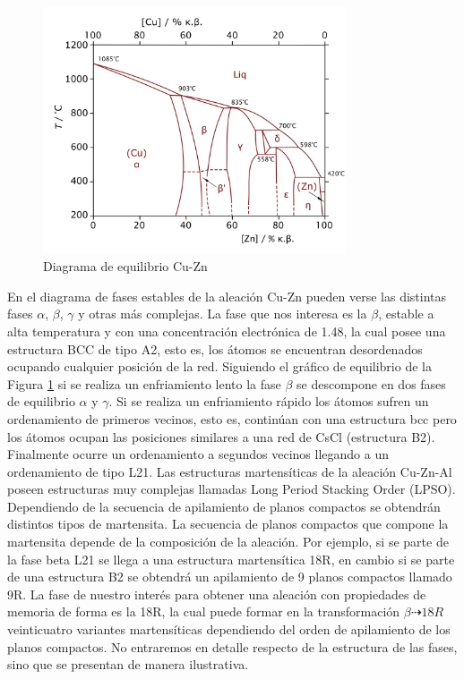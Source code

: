 \documentclass[a4paper,12pt,fleqn,twoside,openany]{book}
\begin{document}
\begin{figure}[h]
 \centering
 \includegraphics[width=0.8\textwidth]{CuZn.png}
 \caption{Diagrama de equilibrio Cu-Zn \cite{CuZn}} 
 \label{fig:CuZn}
 \end{figure}


En el diagrama de fases estables de la aleación Cu-Zn pueden verse las distintas fases $\alpha$, $\beta$, $\gamma$ y otras más complejas. La fase que nos 
interesa es la $\beta$, estable a alta temperatura y con una concentración electrónica de 1.48, la cual posee una estructura BCC de tipo A2, esto es, 
los átomos se encuentran desordenados ocupando cualquier posición de la red. Siguiendo el gráfico de equilibrio de la Figura \ref{fig:CuZn} si se realiza 
un enfriamiento lento 
la fase $\beta$ se descompone en dos fases de equilibrio $\alpha$ y $\gamma$. Si se realiza un enfriamiento rápido los átomos sufren un ordenamiento 
de primeros vecinos, esto es, continúan con una estructura bcc pero los átomos ocupan las posiciones similares a una red de CsCl (estructura B2). 
Finalmente ocurre un ordenamiento a segundos vecinos llegando a un ordenamiento de tipo L21. Las estructuras martensíticas de la aleación Cu-Zn-Al 
poseen estructuras muy complejas llamadas Long Period Stacking Order (LPSO). Dependiendo de la secuencia de apilamiento de planos 
compactos se obtendrán distintos tipos de martensita. La secuencia de planos compactos que compone la martensita depende de la composición de la 
aleación. Por ejemplo, si se parte de la fase beta L21 se llega a una estructura martensítica 18R, en cambio si se parte de una estructura B2 se 
obtendrá un apilamiento de 9 planos compactos llamado 9R. La fase de nuestro interés para obtener una aleación con propiedades de memoria de forma 
es la 18R, la cual puede formar en la transformación $\beta \dashrightarrow 18R$ veinticuatro variantes martensíticas dependiendo del orden de apilamiento 
de los planos compactos. No entraremos en detalle respecto de la estructura de las fases, sino que se presentan de manera ilustrativa.
\end{document}
